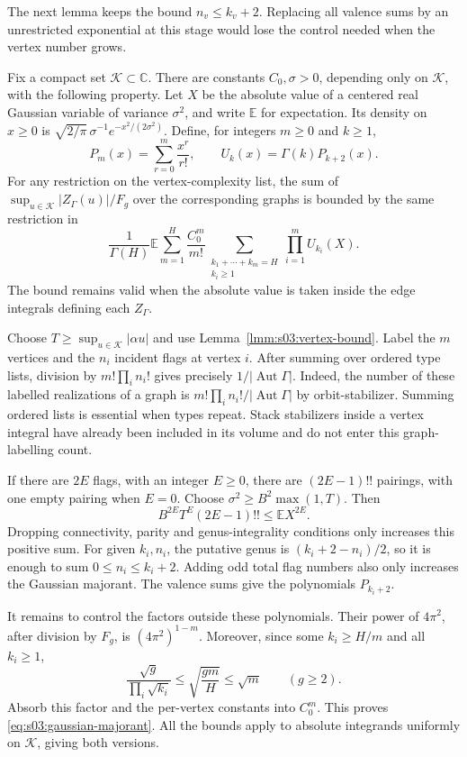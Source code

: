The next lemma keeps the bound $n_v\leq k_v+2$. Replacing all valence
sums by an unrestricted exponential at this stage would lose the
control needed when the vertex number grows.

\begin{lmm}
\label{lmm:s03:pairing-majorant}
Fix a compact set $\mathcal K\subset\mathbb C$. There are constants
$C_0,\sigma>0$, depending only on $\mathcal K$, with the following
property. Let $X$ be the absolute value of a centered real Gaussian
variable of variance $\sigma^2$, and write $\mathbb E$ for expectation.
Its density on $x\geq0$ is
$\sqrt{2/\pi}\,\sigma^{-1}e^{-x^2/(2\sigma^2)}$.
Define, for integers $m\geq0$ and $k\geq1$,
\begin{equation}
\label{eq:s03:counting-polynomials}
P_m(x)=\sum_{r=0}^m\frac{x^r}{r!},\qquad
U_k(x)=\Gamma(k)P_{k+2}(x).
\end{equation}
For any restriction on the vertex-complexity list, the sum of
$\sup_{u\in\mathcal K}|Z_\Gamma(u)|/F_g$ over the corresponding
graphs is bounded by the same restriction in
\begin{equation}
\label{eq:s03:gaussian-majorant}
\frac1{\Gamma(H)}\mathbb E
 \sum_{m=1}^H\frac{C_0^m}{m!}
 \sum_{\substack{k_1+\cdots+k_m=H\\k_i\geq1}}
 \prod_{i=1}^m U_{k_i}(X).
\end{equation}
The bound remains valid when the absolute value is taken inside
the edge integrals defining each $Z_\Gamma$.
\end{lmm}
\begin{prf}
Choose $T\geq\sup_{u\in\mathcal K}|\alpha u|$ and use
Lemma~\ref{lmm:s03:vertex-bound}. Label the $m$ vertices and the
$n_i$ incident flags at vertex $i$. After summing over ordered type
lists, division by $m!\prod_i n_i!$ gives precisely
$1/|\operatorname{Aut}\Gamma|$. Indeed, the number of these labelled
realizations of a graph is $m!\prod_i n_i!/|\operatorname{Aut}\Gamma|$
by orbit-stabilizer. Summing ordered lists is essential when types
repeat. Stack stabilizers inside a vertex integral have already been
included in its volume and do not enter this graph-labelling count.

If there are $2E$ flags, with an integer $E\geq0$, there are
$(2E-1)!!$ pairings, with one empty pairing when $E=0$.
Choose $\sigma^2\geq B^2\max(1,T)$. Then
\[
B^{2E}T^E(2E-1)!!\leq\mathbb E X^{2E}.
\]
Dropping connectivity, parity and genus-integrality conditions only
increases this positive sum. For given $k_i,n_i$, the putative genus
is $(k_i+2-n_i)/2$, so it is enough to sum $0\leq n_i\leq k_i+2$.
Adding odd total flag numbers also only increases the Gaussian
majorant. The valence sums give the polynomials $P_{k_i+2}$.

It remains to control the factors outside these polynomials. Their
power of $4\pi^2$, after division by $F_g$, is $(4\pi^2)^{1-m}$.
Moreover, since some $k_i\geq H/m$ and all $k_i\geq1$,
\[
\frac{\sqrt g}{\prod_i\sqrt{k_i}}
\leq\sqrt{\frac{gm}{H}}\leq\sqrt m\qquad(g\geq2).
\]
Absorb this factor and the per-vertex constants into $C_0^m$.
This proves \eqref{eq:s03:gaussian-majorant}. All the bounds apply
to absolute integrands uniformly on $\mathcal K$, giving both versions.
\end{prf}


